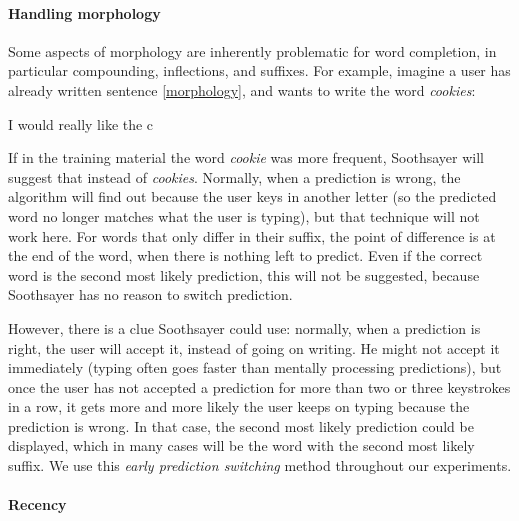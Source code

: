 \documentclass[12pt]{article}
\begin{document}
\paragraph{Handling morphology} \label{early}

Some aspects of morphology are inherently problematic for word completion, in particular compounding, inflections, and suffixes. For example, imagine a user has already written sentence \ref{morphology}, and wants to write the word \emph{cookies}:

\begin{examples}
\item I would really like the c \label{morphology}
\end{examples}

If in the training material the word \emph{cookie} was more frequent, Soothsayer will suggest that instead of \emph{cookies}. Normally, when a prediction is wrong, the algorithm will find out because the user keys in another letter (so the predicted word no longer matches what the user is typing), but that technique will not work here. For words that only differ in their suffix, the point of difference is at the end of the word, when there is nothing left to predict. Even if the correct word is the second most likely prediction, this will not be suggested, because Soothsayer has no reason to switch prediction.

However, there is a clue Soothsayer could use: normally, when a prediction is right, the user will accept it, instead of going on writing. He might not accept it immediately (typing often goes faster than mentally processing predictions), but once the user has not accepted a prediction for more than two or three keystrokes in a row, it gets more and more likely the user keeps on typing because the prediction is wrong. In that case, the second most likely prediction could be displayed, which in many cases will be the word with the second most likely suffix. We use this \emph{early prediction switching} method throughout our experiments.

\paragraph{Recency} \label{rb}
\end{document}
